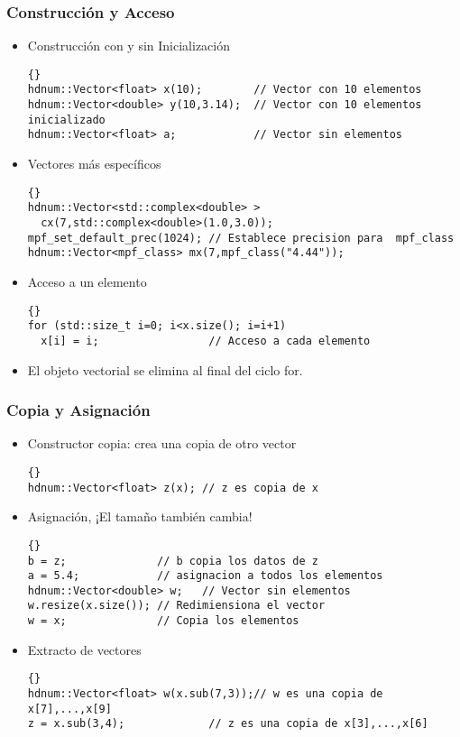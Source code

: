 \documentclass[a4paper,11pt]{article}
\theoremstyle{definition}
\begin{document}
\begin{frame}[fragile]
\frametitle{Construcción y Acceso}
\begin{itemize}
\item Construcción con y sin Inicialización\\
{\footnotesize{\begin{lstlisting}{}
hdnum::Vector<float> x(10);        // Vector con 10 elementos
hdnum::Vector<double> y(10,3.14);  // Vector con 10 elementos inicializado
hdnum::Vector<float> a;            // Vector sin elementos
\end{lstlisting}}}
\item Vectores más específicos\\
{\footnotesize{\begin{lstlisting}{}
hdnum::Vector<std::complex<double> >
  cx(7,std::complex<double>(1.0,3.0));
mpf_set_default_prec(1024); // Establece precision para  mpf_class
hdnum::Vector<mpf_class> mx(7,mpf_class("4.44"));
\end{lstlisting}}}
\item Acceso a un elemento\\
{\footnotesize{\begin{lstlisting}{}
for (std::size_t i=0; i<x.size(); i=i+1)
  x[i] = i;                 // Acceso a cada elemento
\end{lstlisting}}}
\item El objeto vectorial se elimina al final del ciclo for.
\end{itemize}
\end{frame}

\begin{frame}[fragile]
\frametitle{Copia y Asignación}
\begin{itemize}
\item Constructor copia: crea una copia de otro vector
{\footnotesize{\begin{lstlisting}{}
hdnum::Vector<float> z(x); // z es copia de x
\end{lstlisting}}}
\item Asignación, ¡El tamaño también cambia!
{\footnotesize{\begin{lstlisting}{}
b = z;              // b copia los datos de z 
a = 5.4;            // asignacion a todos los elementos
hdnum::Vector<double> w;   // Vector sin elementos
w.resize(x.size()); // Redimiensiona el vector 
w = x;              // Copia los elementos
\end{lstlisting}}}
\item Extracto de vectores\\
{\footnotesize{\begin{lstlisting}{}
hdnum::Vector<float> w(x.sub(7,3));// w es una copia de x[7],...,x[9]
z = x.sub(3,4);             // z es una copia de x[3],...,x[6]
\end{lstlisting}}}
\end{itemize}
\end{frame}
\end{document}
